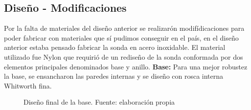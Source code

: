 \begin{appendices}
\subsection*{Diseño - Modificaciones}
Por la falta de materiales del dise\~no anterior 
se realizar\'on modif\'idicaciones para poder fabricar con materiales que s\'i pudimos conseguir en el pa\'is, 
en el diseño anterior estaba pensado fabricar la sonda en acero inoxidable.
El material utilizado fue Nylon que requiri\'o de un rediseño de la sonda conformada por dos elementos principales denominados base y anillo. 
\textbf{Base: }
Para una mejor robustez la base, se ensancharon las paredes internas y se dise\~no con  rosca interna Whitworth fina.\\ 
\begin{figure}[ht]
\centering
{}
\caption{Dise\~no final de la base. Fuente: elaboración propia}
\label{fig:Base2019}
\end{figure}


\end{appendices}
